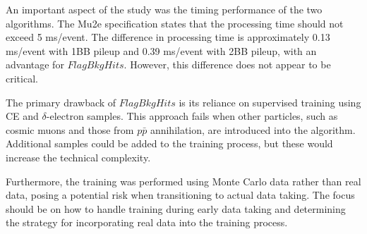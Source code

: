 An important aspect of the study was the 
timing performance of the two algorithms. The Mu2e specification states 
that the processing time should not exceed 5 ms/event. The 
difference in processing time is approximately 0.13 ms/event with 
1BB pileup and 0.39 ms/event with 2BB pileup, with an advantage for $FlagBkgHits$. 
However, this difference does not appear to be critical.

The primary drawback of $FlagBkgHits$ is its 
reliance on supervised training using 
CE and $\delta$-electron samples. This 
approach fails when other particles, such 
as cosmic muons and those from $p\bar{p}$ 
annihilation, are introduced into the algorithm.
Additional samples could be added to the training 
process, but these would increase the technical complexity. 

Furthermore, the training was performed using 
Monte Carlo data rather than real data, 
posing a potential risk when transitioning 
to actual data taking. The focus should be on how 
to handle training during early data taking and 
determining the strategy for incorporating real data into the training process.

